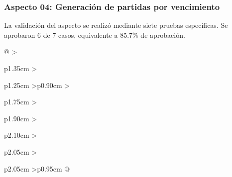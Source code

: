 \subsubsection{Aspecto 04: Generación de partidas por vencimiento}
La validación del aspecto se realizó mediante siete pruebas específicas. Se aprobaron 6 de 7 casos, equivalente a 85.7\% de aprobación.

\begingroup\fontsize{8}{10}\selectfont\renewcommand{\arraystretch}{1.25}\setlength{\tabcolsep}{2pt}
\begin{xltabular}{\linewidth}{@{}
>{\raggedright\arraybackslash}p{1.35cm}
>{\raggedright\arraybackslash}p{1.25cm}
>{\centering\arraybackslash}p{0.90cm}
>{\raggedright\arraybackslash}p{1.75cm}
>{\raggedright\arraybackslash}p{1.90cm}
>{\raggedright\arraybackslash}p{2.10cm}
>{\raggedright\arraybackslash}p{2.05cm}
>{\raggedright\arraybackslash}p{2.05cm}
>{\centering\arraybackslash}p{0.95cm}
@{}}


\end{xltabular}
